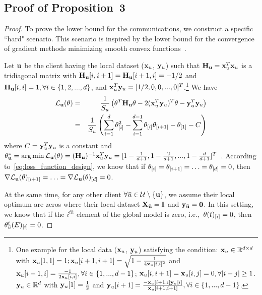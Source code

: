 \subsection{Proof of Proposition~3}\label{app:proof_proposition}

\begin{proof}
To prove the lower bound for the communications,  we construct a specific ``hard" scenario. This scenario is inspired by the lower bound for the convergence of gradient methods minimizing smooth convex functions~\cite[Sect.~2.1.2]{nesterov2003introductory}.   

Let $\mathbf{u}$ be the client having the local dataset (${\mathbf{x}}_u$, $\mathbf{y}_u$) such that $\mathbf{H}_{\mathbf{u}}= {\mathbf{x}}_u^T{\mathbf{x}}_u$ is a tridiagonal matrix with $\mathbf{H}_{\mathbf{u}}[i,i+1] = \mathbf{H}_{\mathbf{u}}[i+1,i] = -1/2$ and $\mathbf{H}_{\mathbf{u}}[i,i] = 1, \forall i\in \{1,2,...,d\}$, and ${\mathbf{x}}_u^T\mathbf{y}_u=[1/2,0,0,...,0]^T$.\footnote{One example for the local data (${\mathbf{x}}_u$, $\mathbf{y}_u$) satisfying the condition: ${\mathbf{x}}_u\in\mathbb{R}^{d\times d}$ with ${\mathbf{x}}_u[1, 1] = 1; {\mathbf{x}}_u[i+1,i+1] =\sqrt{1-\frac{1}{4{\mathbf{x}}_u[i, i]^2}}$ and ${\mathbf{x}}_u[i+1, i]=\frac{-1}{2{\mathbf{x}}_u[i, i]}, \forall i\in \{1, ..., d-1\}$; ${\mathbf{x}}_u[i,i+1]={\mathbf{x}}_u[i, j]=0, \forall |i-j|\geq 1$. $\mathbf{y}_u\in\mathbb{R}^{d}$ with $\mathbf{y}_u[1] = \frac{1}{2}$ and $\mathbf{y}_u[i+1]= \frac{-{\mathbf{x}}_u[i+1, i]\mathbf{y}_u[i]}{{\mathbf{x}}_u[i+1, i+1]},  \forall i\in \{1, ..., d-1\}$.} We have
\begin{eqnarray}
{\ensuremath{\mathcal{L}}_{\mathbf{u}}}(\theta) &=& \frac{1}{S_u} \left(\theta^T\mathbf{H}_{\mathbf{u}}\theta-2({\mathbf{x}}_u^T\mathbf{y}_u)^T\theta - \mathbf{y}_u^T\mathbf{y}_u \right) \nonumber\\
&=& \frac{1}{S_u} \left(\sum_{i=1}^{d} \theta_{[i]}^2 - \sum_{i=1}^{d-1} \theta_{[i]}\theta_{[i+1]} -\theta_{[1]} - C \right) \label{eq:loss_function_design}
\end{eqnarray}
where $C=\mathbf{y}_u^T\mathbf{y}_u$ is a constant and
$\theta_{\mathbf{u}}^* =\arg\min {\ensuremath{\mathcal{L}}_{\mathbf{u}}}(\theta) =  (\mathbf{H}_{\mathbf{u}})^{-1}{\mathbf{x}}_u^T\mathbf{y}_u = [1-\frac{1}{d+1}, 1-\frac{2}{d+1}, ..., 1-\frac{d}{d+1}]^T$~\cite{nesterov2003introductory}. According to~\eqref{eq:loss_function_design}, we know that if $\theta_{[i]}=\theta_{[i+1]}=\ldots=\theta_{[d]}=0$, then
$\nabla{\ensuremath{\mathcal{L}}_{\mathbf{u}}} (\theta)_{[i+1]}=\ldots=\nabla{\ensuremath{\mathcal{L}}_{\mathbf{u}}} (\theta)_{[d]} = 0$. 




At the same time, for any other client $\forall \bar u\in \mathcal{U} \setminus \{\mathbf{u}\}$, we assume their local optimum are zeros where their local dataset $\mathbf{X}_{\bar {\mathbf{u}}}=\mathbf{I}$ and $\mathbf{y}_{\bar {\mathbf{u}}}  = \mathbf{0}$.
In this setting, we know that if the $i^{th}$ element of the global model is zero, i.e.,~$\theta(t)_{[i]}=0$, then $\theta^t_{\bar u}(E)_{[i]}=0$. 
 

\end{proof}
